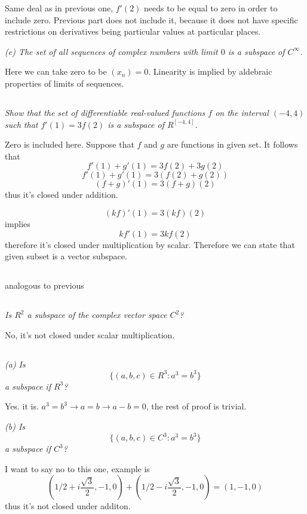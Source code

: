\documentclass[11pt,oneside,titlepage]{book}
\begin{document}
Same deal as in previous one, $f'(2)$ needs to be equal to zero in order
to include zero. Previous part does not include it, because it does not
have specific restrictions on derivatives being particular values at particular places.

\textit{(e) The set of all sequences of complex numbers with limit $0$ is a
  subspace of $C^{\infty}$.}

Here we can take zero to be $(x_n) = 0$. Linearity is implied by aldebraic
properties of limits of sequences.

\subsection{}
\textit{Show that the set of differentiable real-valued functions $f$ on the
  interval $(-4, 4)$ such that $f'(1) = 3f(2)$ is a subspace of $R^{[-4, 4]}$.}

Zero is included here. Suppose that $f$ and $g$ are functions in given set.
It follows that
$$f'(1) + g'(1) = 3f(2) + 3g(2)$$
$$f'(1) + g'(1) = 3(f(2) + g(2))$$
$$(f + g)'(1) = 3(f + g)(2)$$
thus it's closed under addition.

$$(kf)'(1) = 3(kf)(2)$$
implies
$$kf'(1) = 3kf(2)$$
therefore it's closed under multiplication by scalar.
Therefore we can state that given subset is a vector subspace.

\subsection{}
analogous to previous

\subsection{}
\textit{Is $R^2$ a subspace of the complex vector space $C^2$?}

No, it's not closed under scalar multiplication.

\subsection{}
\textit{(a) Is }
$$\{(a, b, c) \in R^3: a^3 = b^3\}$$
\textit{a subspace if $R^3$?}

Yes. it is. $a^3 = b^3 \to a = b \to a - b = 0$, the rest of proof is trivial.

\textit{(b) Is }
$$\{(a, b, c) \in C^3: a^3 = b^3\}$$
\textit{a subspace if $C^3$?}

I want to say no to this one, example is
$$(1/2 + i\frac{\sqrt{3}}{2}, -1, 0) +
(1/2 - i\frac{\sqrt{3}}{2}, -1, 0) =
(1, -1, 0)$$
thus it's not closed under additon.
\end{document}
